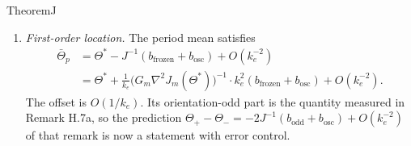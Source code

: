 \begin{thm}{Theorem}{J}
\begin{enumerate}[label=\textup{(\alph*)}]
    \textup{(CL)} with $\norm{\Theta(0) - \Theta^*}_{\Ginv} \le \rho_0$ and $\norm{x(0) - x_m(0)} \le R$ converges to
    the periodic orbit, and
    \begin{gather*}
      \norm{\Theta(t) - \Theta_p(t)}_{\Ginv} + \norm{x(t) - x_p(t)}
      \le Ce^{-\mu t}\bigl(\norm{\Theta(0) - \Theta_p(0)}_{\Ginv} + \norm{x(0) - x_p(0)}\bigr),\\
      \mu := \frac{\lambda_*}{k_e}(1 - \kappa),
    \end{gather*}
    with $\kappa = \kappa(\rho_0,1/k_e)\to0$ as $(\rho_0,1/k_e)\to0$. The basin radius $\rho_0$ does not depend on
    $k_e$; the rate is $\lambda_*/k_e$ to leading order, that is, $\lambda_*$ in slow time.
  \item \emph{First-order location.} The period mean satisfies
    \begin{align*}
      \bar\Theta_p &= \Theta^* - J^{-1}(b_{\mathrm{frozen}} + b_{\mathrm{osc}}) + O(k_e^{-2})\\
      &= \Theta^* + \frac1{k_e}\bigl(G_m\nabla^2J_m(\Theta^*)\bigr)^{-1}\cdot k_e^2(b_{\mathrm{frozen}} + b_{\mathrm{osc}})
      + O(k_e^{-2}).
    \end{align*}
    The offset is $O(1/k_e)$. Its orientation-odd part is the quantity measured in Remark H.7a, so the prediction
    $\Theta_+ - \Theta_- = -2J^{-1}(b_{\mathrm{odd}} + b_{\mathrm{osc}}) + O(k_e^{-2})$ of that remark is now a
    statement with error control.
\end{enumerate}
\end{thm}

